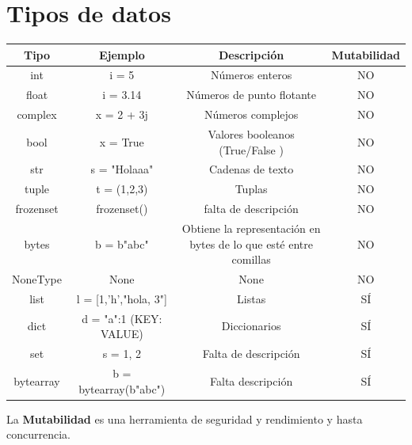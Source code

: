 \documentclass[a4paper,10pt]{article}
\begin{document}
\section*{Tipos de datos}
\begin{center}
\begin{tabular}{| c | c | c | c |}
    \hline
    Tipo &  Ejemplo & Descripción & Mutabilidad \\
    \hline\hline
    int & i = 5 & Números enteros & NO \\
    \hline
    float & i = 3.14 & Números de punto flotante & NO \\
    \hline
    complex  & x = 2 + 3j & Números complejos & NO \\
    \hline
    bool & x = True & Valores booleanos (True/False ) & NO \\
    \hline
    str & s = "Holaaa" & Cadenas de texto & NO\\
    \hline
    tuple & t = (1,2,3) & Tuplas & NO \\
    \hline
    frozenset & frozenset({}) & falta de descripción & NO \\
    \hline
    bytes & b = b"abc" & Obtiene la representación en bytes de lo que esté entre comillas & NO \\
    \hline
    NoneType & None & None & NO \\
    \hline
    list & l = [1,'h',"hola, 3"] & Listas & SÍ \\
    \hline
    dict & d = {"a":1} (KEY: VALUE) & Diccionarios & SÍ \\
    \hline
    set & s = {1, 2} & Falta de descripción & SÍ \\
    \hline
    bytearray & b = bytearray(b"abc") & Falta descripción & SÍ \\
    \hline

\end{tabular}
\end{center}
La \textbf{Mutabilidad} es una herramienta de seguridad y rendimiento y hasta concurrencia.\\
\end{document}

